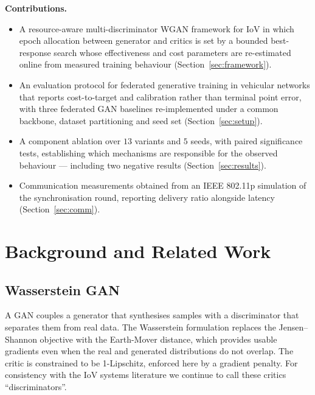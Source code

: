 \documentclass[journal]{IEEEtran}
\begin{document}
\textbf{Contributions.}
\begin{itemize}
\item A resource-aware multi-discriminator WGAN framework for IoV in which
      epoch allocation between generator and critics is set by a bounded
      best-response search whose effectiveness and cost parameters are
      re-estimated online from measured training behaviour
      (Section~\ref{sec:framework}).
\item An evaluation protocol for federated generative training in vehicular
      networks that reports cost-to-target and calibration rather than terminal
      point error, with three federated GAN baselines re-implemented under a
      common backbone, dataset partitioning and seed set
      (Section~\ref{sec:setup}).
\item A component ablation over $13$ variants and $5$ seeds, with paired
      significance tests, establishing which mechanisms are responsible for the
      observed behaviour --- including two negative results
      (Section~\ref{sec:results}).
\item Communication measurements obtained from an IEEE 802.11p simulation of the
      synchronisation round, reporting delivery ratio alongside latency
      (Section~\ref{sec:comm}).
\end{itemize}


\section{Background and Related Work}

\subsection{Wasserstein GAN}
A GAN \cite{creswell2018gan} couples a generator that synthesises samples with a
discriminator that separates them from real data. The Wasserstein formulation
\cite{arjovsky2017wgan} replaces the Jensen--Shannon objective with the
Earth-Mover distance, which provides usable gradients even when the real and
generated distributions do not overlap. The critic is constrained to be
1-Lipschitz, enforced here by a gradient penalty. For consistency with the IoV
systems literature we continue to call these critics ``discriminators''.
\end{document}
